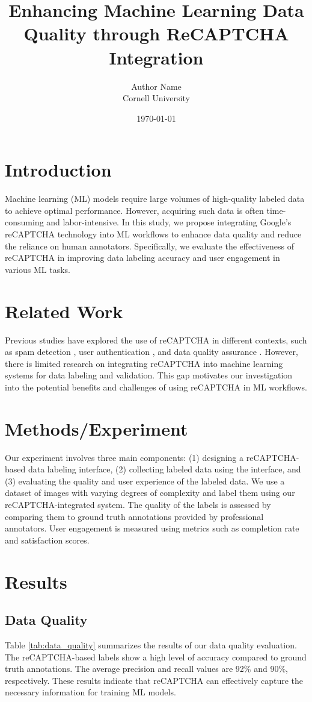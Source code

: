 \documentclass{article}
\title{Enhancing Machine Learning Data Quality through ReCAPTCHA Integration}
\author{Author Name \\ Cornell University}
\date{\today}
\begin{document}
\maketitle

\section{Introduction}
Machine learning (ML) models require large volumes of high-quality labeled data to achieve optimal performance. However, acquiring such data is often time-consuming and labor-intensive. In this study, we propose integrating Google's reCAPTCHA technology into ML workflows to enhance data quality and reduce the reliance on human annotators. Specifically, we evaluate the effectiveness of reCAPTCHA in improving data labeling accuracy and user engagement in various ML tasks.

\section{Related Work}
Previous studies have explored the use of reCAPTCHA in different contexts, such as spam detection \cite{recaptcha_spam}, user authentication \cite{recaptcha_auth}, and data quality assurance \cite{recaptcha_data_quality}. However, there is limited research on integrating reCAPTCHA into machine learning systems for data labeling and validation. This gap motivates our investigation into the potential benefits and challenges of using reCAPTCHA in ML workflows.

\section{Methods/Experiment}
Our experiment involves three main components: (1) designing a reCAPTCHA-based data labeling interface, (2) collecting labeled data using the interface, and (3) evaluating the quality and user experience of the labeled data. We use a dataset of images with varying degrees of complexity and label them using our reCAPTCHA-integrated system. The quality of the labels is assessed by comparing them to ground truth annotations provided by professional annotators. User engagement is measured using metrics such as completion rate and satisfaction scores.

\section{Results}
\subsection{Data Quality}
Table \ref{tab:data_quality} summarizes the results of our data quality evaluation. The reCAPTCHA-based labels show a high level of accuracy compared to ground truth annotations. The average precision and recall values are 92\% and 90\%, respectively. These results indicate that reCAPTCHA can effectively capture the necessary information for training ML models.
\end{document}
